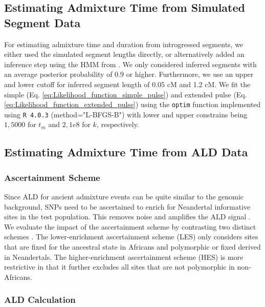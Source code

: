\documentclass[11pt]{article}
\begin{document}
\subsection{Estimating Admixture Time from Simulated Segment Data}\label{Estimating admixture time from simulated segment data}

For estimating admixture time and duration from introgressed segments, we either used the simulated segment lengths directly,  or alternatively added an inference step using the HMM from \cite{skov_detecting_2018}. We only considered inferred segments with an average posterior probability of 0.9 or higher. Furthermore, we use an upper and lower cutoff for inferred segment length of 0.05 cM and 1.2 cM. We fit the simple (Eq. \ref{eq:Likelihood_function_simple_pulse}) and extended pulse (Eq. \ref{eq:Likelihood_function_extended_pulse}) using the \texttt{optim} function implemented using \texttt{R 4.0.3} (method="L-BFGS-B") with lower and upper constrains being $1,5000$ for $t_m$ and $2,1e8$ for $k$, respectively. 

\subsection{Estimating Admixture Time from ALD Data}\label{Estimating admixture time from ALD data}

\subsubsection{Ascertainment Scheme}\label{asceteinment scheme}
Since ALD for ancient admixture events can be quite similar to the genomic background, SNPs need to be ascertained to enrich for
Neandertal informative sites in the test population. This removes noise and
amplifies the ALD signal \citep{sankararaman_date_2012}. 
We evaluate the impact of the ascertainment scheme by contrasting two distinct schemes \citep{sankararaman_date_2012,fu_genome_2014}. The lower-enrichment ascertainment scheme (LES) only considers  sites that are fixed for the ancestral state in
Africans and polymorphic or fixed derived in Neandertals. The higher-enrichment
ascertainment scheme (HES) is more restrictive in that it further excludes all sites that are not polymorphic in non-Africans.

\subsubsection{ALD Calculation}\label{ALD calculation}
\end{document}

